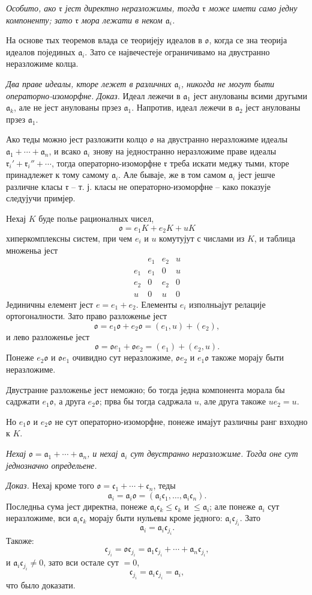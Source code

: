 ﻿\documentclass[11pt]{article}
\providecommand{\ma}{\mathfrak{a}}
\providecommand{\mc}{\mathfrak{c}}
\providecommand{\mo}{\mathfrak{o}}
\providecommand{\mr}{\mathfrak{r}}
\begin{document}
\emph{Особито, ако $\mr$ јест директно неразложимы, тогда $\mr$ може имети само једну компоненту; зато $\mr$ мора лежати в неком $\ma_i$.}

На основе тых теоремов влада се теоријеју идеалов в $\mo$, когда се зна теорија идеалов појединых $\ma_i$. Зато се највечестеје ограничивамо на двустранно неразложиме колца.

\emph{Два праве идеалы, кторе лежет в различних $\ma_i$, никогда не могут быти операторно-изоморфне.}
\emph{Доказ.} Идеал лежечи в $\ma_1$ јест анулованы всими другыми $\ma_k$, але не јест анулованы прзез $\ma_1$. Напротив, идеал лежечи в $\ma_2$ јест анулованы прзез $\ma_1$.

Ако теды можно јест разложити колцо $\mo$ на двустранно неразложиме идеалы $\ma_1+\cdots+\ma_n$, и всако $\ma_i$ знову на једностранно неразложиме праве идеалы $\mr_i'+\mr_i''+\cdots$, тогда операторно-изоморфне $\mr$ треба искати меджу тыми, кторе принадлежет к тому самому $\ma_i$. Але бываје, же в том самом $\ma_i$ јест јешче различне класы $\mr$ -- т. ј. класы не операторно-изоморфне -- како показује следујучи примјер.

Нехај $K$ буде полье рационалных чисел,
\[
        \mo=e_1K+e_2K+uK
\]
хиперкомплексны систем, при чем $e_i$ и $u$ комутујут с числами из $K$, и таблица множеньа јест
\[
\begin{array}{c|ccc}
     & e_1&e_2&u\\ \hline
 e_1 & e_1&0&u\\
 e_2 & 0&e_2&0\\
 u   & 0&u&0
\end{array}
\]
Јединичны елемент јест $e=e_1+e_2$. Елементы $e_i$ изполньајут релације ортогоналности. Зато право разложенье јест
\[
        \mo=e_1\mo+e_2\mo=(e_1,u)+(e_2),
\]
и лево разложенье јест
\[
        \mo=\mo e_1+\mo e_2=(e_1)+(e_2,u).
\]
Понеже $e_2\mo$ и $\mo e_1$ очивидно сут неразложиме, $\mo e_2$ и $e_1\mo$ такоже морају быти неразложиме.

Двустранне разложенье јест неможно; бо тогда једна компонента морала бы садржати $e_1\mo$, а друга $e_2\mo$; прва бы тогда садржала $u$, але друга такоже $ue_2=u$.

Но $e_1\mo$ и $e_2\mo$ не сут операторно-изоморфне, понеже имајут различны ранг взходно к $K$.

\emph{Нехај $\mo=\ma_1+\cdots+\ma_n$, и нехај $\ma_i$ сут двустранно неразложиме. Тогда оне сут једнозначно определьене.}

\emph{Доказ.} Нехај кроме того $\mo=\mc_1+\cdots+\mc_n$, теды
\[
        \ma_i=\ma_i\mo=(\ma_i\mc_1,\ldots,\ma_i\mc_n).
\]
Последньа сума јест директна, понеже $\ma_i\mc_k\leq\mc_k$ и $\leq\ma_i$; але понеже $\ma_i$ сут неразложиме, вси $\ma_i\mc_k$ морају быти нульевы кроме једного: $\ma_i\mc_{j_i}$. Зато
\[
        \ma_i=\ma_i\mc_{j_i}.
\]
Такоже:
\[
        \mc_{j_i}=\mo\mc_{j_i}=\ma_1\mc_{j_i}+\cdots+\ma_n\mc_{j_i},
\]
и $\ma_i\mc_{j_i}\ne0$, зато вси остале сут $=0$,
\[
        \mc_{j_i}=\ma_i\mc_{j_i}=\ma_i,
\]
что было доказати.
\end{document}
